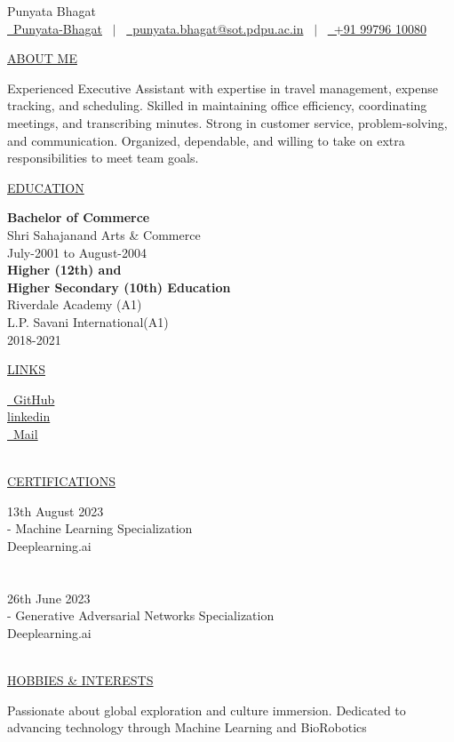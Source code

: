 \documentclass[11pt]{article}
\newcommand{\resumetitle}[3]{
    \AddToShipoutPictureBG{
        \AtPageUpperLeft {
        \raisebox{-0.09\paperheight}{
            \color{black!85}\rule{2\paperwidth}{\paperheight}}
        }}
    \begin{Center}
        \begingroup
        \titlethin
        \color{black!10}\Huge{#1}
        \titlethick
        \color{black!5}\Huge{#2} \\
        \vspace{2mm}
        \textrm{\color{black!15}\Large{#3}}
        \endgroup
    \end{Center}
    \vspace{7mm}
}
\newcommand{\betteruline}[1]{
    \uline{#1}
}
\newcommand{\sectiontitle}[1]{
    \begingroup
        \titlebold
        \betteruline{\Large\uppercase{#1}  }
        \vspace{1.7mm}
    \endgroup
}
\newcommand{\sectioncontent}[1]{
    \begingroup
        \begin{FlushLeft}
        \vspace{-3mm}
        \sffamily\small#1
        \end{FlushLeft}
    \endgroup
    \vspace{2mm}
}
\newcommand{\honor}[2]{
    \textcolor{black!70}{#1} - #2 \\
    \vspace{1.5mm}
}
\begin{document}
    \resumetitle{Punyata}{Bhagat} {
        \href{https://www.linkedin.com/in/punyata-bhagat-01470025a/}{\raisebox{-0.05\height}\faLinkedin\ Punyata-Bhagat} \ $|$ \ 
        \href{mailto:punyata.bhagat@sot.pdpu.ac.in.com}{\raisebox{-0.05\height}\faEnvelope \ punyata.bhagat@sot.pdpu.ac.in} \ $|$ \ 
        \href{tel:+91 99796 10080}{\raisebox{-0.05\height}\faMobile \ +91 99796 10080} \\
        }

    \setlength{\columnsep}{7mm}
    \begin{paracol}{2}

    \sectiontitle{about me}
    \sectioncontent{
        Experienced Executive Assistant with expertise in travel management, expense tracking, and scheduling. Skilled in maintaining office efficiency, coordinating meetings, and transcribing minutes. Strong in customer service, problem-solving, and communication. Organized, dependable, and willing to take on extra responsibilities to meet team goals.    }

    \sectiontitle{education}
    \sectioncontent{
        \textbf{Bachelor of Commerce} \\
        Shri Sahajanand Arts & Commerce \\
        \textcolor{black!70}{July-2001 to August-2004} \\
        \vspace{2mm}
        \textbf{Higher (12th) and \\
        Higher Secondary (10th) Education } \\
        Riverdale Academy (A1)\\
        L.P. Savani International(A1)\\
        \textcolor{black!70}{2018-2021} \\
    }

    \sectiontitle{links}
    \sectioncontent{
        \href{https://github.com/Jaivik-Jariwala}{\raisebox{-0.05\height}\faGithub\ GitHub} \hspace{2.1mm} \\
        \href{https://linkedin.com/in/jaivik-jariwala}{linkedin} \\
        \href{mailto:jaivikjariwala111@gmail.com}{\raisebox{-0.05\height}\faEnvelope \ Mail} \\\
    }
    \sectiontitle{Certifications}
    \sectioncontent{
        \honor{13th August 2023\\}{Machine Learning Specialization \\ Deeplearning.ai}\\
        \\
        \honor{26th June 2023\\}{Generative Adversarial Networks Specialization \\ Deeplearning.ai}\\
    }
    \sectiontitle{Hobbies \& Interests}
    \sectioncontent{
       Passionate about global exploration and culture immersion. Dedicated to advancing technology through Machine Learning and BioRobotics\\
    }


\end{paracol}
\end{document}

